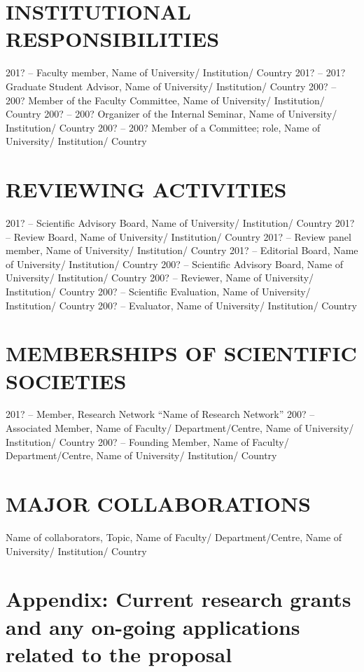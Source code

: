 \documentclass[11pt]{report}
\begin{document}
\section{INSTITUTIONAL RESPONSIBILITIES}

201? – 	Faculty member, Name of University/ Institution/ Country
201? – 201? 	Graduate Student Advisor, Name of University/ Institution/ Country
200? – 200? 	Member of the Faculty Committee, Name of University/ Institution/ Country 
200? – 200? 	Organizer of the Internal Seminar, Name of University/ Institution/ Country
200? – 200? 	Member of a Committee; role, Name of University/ Institution/ Country


\section{REVIEWING ACTIVITIES}

201? – 	Scientific Advisory Board, Name of University/ Institution/ Country
201? – 	Review Board, Name of University/ Institution/ Country
201? –	Review panel member, Name of University/ Institution/ Country
201? – 	Editorial Board, Name of University/ Institution/ Country
200? – 	Scientific Advisory Board, Name of University/ Institution/ Country
200? –	Reviewer, Name of University/ Institution/ Country 
200? –	Scientific Evaluation, Name of University/ Institution/ Country
200? –	Evaluator, Name of University/ Institution/ Country


\section{MEMBERSHIPS OF SCIENTIFIC SOCIETIES}

201? –	Member, Research Network “Name of Research Network”
200? –	Associated Member, Name of Faculty/ Department/Centre, Name of University/ Institution/ Country
200? –	Founding Member, Name of Faculty/ Department/Centre, Name of University/ Institution/ Country 

\section{MAJOR COLLABORATIONS}

Name of collaborators, Topic, Name of Faculty/ Department/Centre, Name of University/ Institution/ Country


\newpage

\section{Appendix: Current research grants and any on-going applications related
to the proposal}
\end{document}

